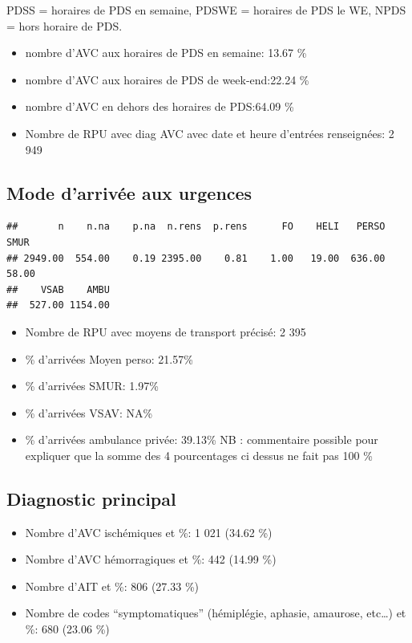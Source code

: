 \documentclass[]{article}
\begin{document}
PDSS = horaires de PDS en semaine, PDSWE = horaires de PDS le WE, NPDS =
hors horaire de PDS.

\begin{itemize}
\itemsep1pt\parskip0pt
\item
  nombre d'AVC aux horaires de PDS en semaine: 13.67 \%
\item
  nombre d'AVC aux horaires de PDS de week-end:22.24 \%
\item
  nombre d'AVC en dehors des horaires de PDS:64.09 \%
\item
  Nombre de RPU avec diag AVC avec date et heure d'entrées renseignées:
  2 949
\end{itemize}

\subsection{Mode d'arrivée aux
urgences}\label{mode-darrivee-aux-urgences}

\begin{verbatim}
##       n    n.na    p.na  n.rens  p.rens      FO    HELI   PERSO    SMUR 
## 2949.00  554.00    0.19 2395.00    0.81    1.00   19.00  636.00   58.00 
##    VSAB    AMBU 
##  527.00 1154.00
\end{verbatim}

\begin{itemize}
\itemsep1pt\parskip0pt
\item
  Nombre de RPU avec moyens de transport précisé: 2 395
\item
  \% d'arrivées Moyen perso: 21.57\%
\item
  \% d'arrivées SMUR: 1.97\%
\item
  \% d'arrivées VSAV: NA\%
\item
  \% d'arrivées ambulance privée: 39.13\% NB : commentaire possible pour
  expliquer que la somme des 4 pourcentages ci dessus ne fait pas 100 \%
\end{itemize}

\subsection{Diagnostic principal}\label{diagnostic-principal-1}

\begin{itemize}
\itemsep1pt\parskip0pt
\item
  Nombre d'AVC ischémiques et \%: 1 021 (34.62 \%)
\item
  Nombre d'AVC hémorragiques et \%: 442 (14.99 \%)
\item
  Nombre d'AIT et \%: 806 (27.33 \%)
\item
  Nombre de codes ``symptomatiques'' (hémiplégie, aphasie, amaurose,
  etc\ldots{}) et \%: 680 (23.06 \%)
\end{itemize}
\end{document}
